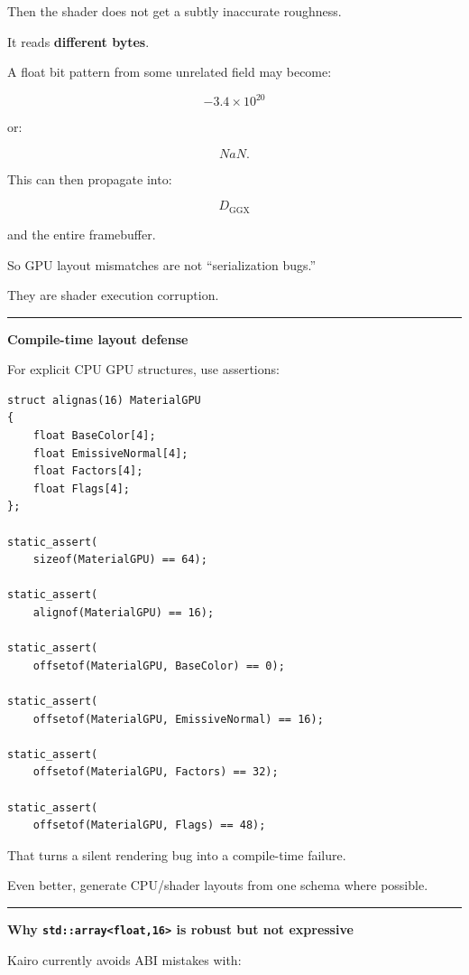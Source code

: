 Then the shader does not get a subtly inaccurate roughness.

It reads \textbf{different bytes}.

A float bit pattern from some unrelated field may become:

\[
-3.4\times10^{20}
\]

or:

\[
NaN.
\]

This can then propagate into:

\[
D_{\text{GGX}}
\]

and the entire framebuffer.

So GPU layout mismatches are not ``serialization bugs.''

They are shader execution corruption.

\begin{center}\rule{0.5\linewidth}{0.5pt}\end{center}

\textbf{Compile-time layout defense}

For explicit CPU GPU structures, use assertions:

\begin{verbatim}
struct alignas(16) MaterialGPU
{
    float BaseColor[4];
    float EmissiveNormal[4];
    float Factors[4];
    float Flags[4];
};

static_assert(
    sizeof(MaterialGPU) == 64);

static_assert(
    alignof(MaterialGPU) == 16);

static_assert(
    offsetof(MaterialGPU, BaseColor) == 0);

static_assert(
    offsetof(MaterialGPU, EmissiveNormal) == 16);

static_assert(
    offsetof(MaterialGPU, Factors) == 32);

static_assert(
    offsetof(MaterialGPU, Flags) == 48);
\end{verbatim}

That turns a silent rendering bug into a compile-time failure.

Even better, generate CPU/shader layouts from one schema where possible.

\begin{center}\rule{0.5\linewidth}{0.5pt}\end{center}

\textbf{Why \texttt{std::array\textless{}float,16\textgreater{}} is robust but not expressive}

Kairo currently avoids ABI mistakes with:

